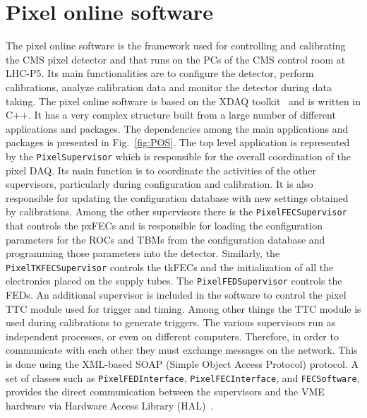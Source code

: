 \section{Pixel online software}\label{sec:BPix_POS}

The pixel online software is the framework used for controlling and calibrating the CMS pixel detector and that runs on the PCs of the CMS control room at LHC-P5.
Its main functionalities are to configure the detector, perform calibrations, analyze calibration data and monitor the detector during data taking.
The pixel online software is based on the XDAQ toolkit~\cite{Brigljevic:2003kg} and is written in C++. It has a very complex structure built from a large number of different applications and packages.
The dependencies among the main applications and packages is presented in Fig.~\ref{fig:POS}.
The top level application is represented by the \texttt{PixelSupervisor} which is responsible for the overall coordination of the pixel DAQ.
Its main function is to coordinate the activities of the other supervisors, particularly during configuration and calibration.
It is also responsible for updating the configuration database with new settings obtained by calibrations.
Among the other supervisors there is the \texttt{PixelFECSupervisor} that controls the pxFECs and is responsible for loading the configuration parameters for the ROCs and TBMs from the configuration database and programming those parameters into the detector.
Similarly, the \texttt{PixelTKFECSupervisor} controls the tkFECs and the initialization of all the electronics placed on the supply tubes. The \texttt{PixelFEDSupervisor} controls the FEDs.
An additional supervisor is included in the software to control the pixel TTC module used for trigger and timing. Among other things the TTC module is used during calibrations to generate triggers.
The various supervisors run as independent processes, or even on different computers. Therefore, in order to communicate with each other they must exchange messages on the network. This is done using the XML-based SOAP (Simple Object Access Protocol) protocol.
A set of classes such as \texttt{PixelFEDInterface}, \texttt{PixelFECInterface}, and \texttt{FECSoftware}, provides the direct communication between the supervisors and the VME hardware via Hardware Access Library (HAL)~\cite{HAL}.

